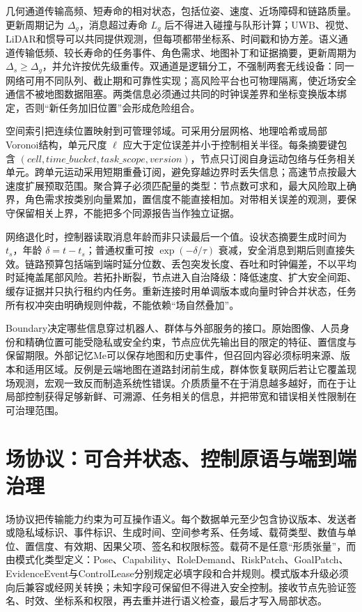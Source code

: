 几何通道传输高频、短寿命的相对状态，包括位姿、速度、近场障碍和链路质量。更新周期记为 $\Delta_g$，消息超过寿命 $L_g$ 后不得进入碰撞与队形计算；UWB、视觉、LiDAR和惯导可以共同提供观测，但每项都带坐标系、时间戳和协方差。语义通道传输低频、较长寿命的任务事件、角色需求、地图补丁和证据摘要，更新周期为 $\Delta_s\ge\Delta_g$，并允许按优先级重传。双通道是逻辑分工，不强制两套无线设备：同一网络可用不同队列、截止期和可靠性实现；高风险平台也可物理隔离，使近场安全通信不被地图数据阻塞。两类信息必须通过共同的时钟误差界和坐标变换版本绑定，否则“新任务加旧位置”会形成危险组合。

空间索引把连续位置映射到可管理邻域。可采用分层网格、地理哈希或局部Voronoi结构，单元尺度 $\ell$ 应大于定位误差并小于控制相关半径。每条摘要键包含 $(cell,time\_bucket,task\_scope,version)$，节点只订阅自身运动包络与任务相关单元。跨单元运动采用短期重叠订阅，避免穿越边界时丢失信息；高速节点按最大速度扩展预取范围。聚合算子必须匹配量的类型：节点数可求和，最大风险取上确界，角色需求按类别向量累加，置信度不能直接相加。对带相关误差的观测，要保守保留相关上界，不能把多个同源报告当作独立证据。

网络退化时，控制器读取消息年龄而非只读最后一个值。设状态摘要生成时间为 $t_s$，年龄 $\delta=t-t_s$；普通权重可按 $\exp(-\delta/\tau)$ 衰减，安全消息到期后则直接失效。链路预算包括端到端时延分位数、丢包突发长度、吞吐和时钟偏差，不以平均时延掩盖尾部风险。若拓扑断裂，节点进入自治降级：降低速度、扩大安全间距、缓存证据并只执行租约内任务。重新连接时用单调版本或向量时钟合并状态，任务所有权冲突由明确规则仲裁，不能依赖“场自然叠加”。

Boundary决定哪些信息穿过机器人、群体与外部服务的接口。原始图像、人员身份和精确位置可能受隐私或安全约束，节点应优先输出目的限定的特征、置信度与保留期限。外部记忆Me可以保存地图和历史事件，但召回内容必须标明来源、版本和适用区域。反例是云端地图在道路封闭前生成，群体恢复联网后若让它覆盖现场观测，宏观一致反而制造系统性错误。介质质量不在于消息越多越好，而在于让局部控制获得足够新鲜、可溯源、任务相关的信息，并把带宽和错误相关性限制在可治理范围。

\section{场协议：可合并状态、控制原语与端到端治理}
\label{sec:field_protocol}

场协议把传输能力约束为可互操作语义。每个数据单元至少包含协议版本、发送者或隐私域标识、事件标识、生成时间、空间参考系、任务域、载荷类型、数值与单位、置信度、有效期、因果父项、签名和权限标签。载荷不是任意“形质张量”，而由模式化类型定义：Pose、Capability、RoleDemand、RiskPatch、GoalPatch、EvidenceEvent与ControlLease分别规定必填字段和合并规则。模式版本升级必须向后兼容或经网关转换；未知字段可保留但不得进入安全控制。接收节点先验证签名、时效、坐标系和权限，再去重并进行语义检查，最后才写入局部状态。

